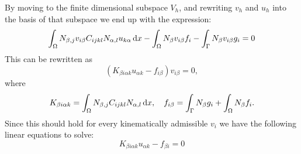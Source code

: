 \documentclass[fem.tex]{subfiles}
\begin{document}
%
By moving to the finite dimensional subspace $V_h$, and rewriting $v_h$ and $u_h$ into the basis of that subspace we end up with the expression:
%
\begin{equation} 
\int_\Omega  N_{\beta,j}v_{i\beta}   C_{ijkl} N_{\alpha,l} u_{k\alpha} \, \mathrm{d} x -\int_\Omega N_\beta v_{i\beta} f_i - \int_\Gamma N_\beta v_{i\beta} g_i = 0
\end{equation}
This can be rewritten as
\begin{equation} 
\left( K_{\beta i \alpha k}u_{\alpha k} - f_{i \beta} \right) v_{i\beta} = 0,
\end{equation}
where
\begin{equation} 
K_{\beta i \alpha k} = \int_\Omega  N_{\beta,j}C_{ijkl}N_{\alpha,l}  \, \mathrm{d} x , \quad f_{i \beta} = \int_\Gamma N_\beta g_i + \int_\Omega N_\beta f_i.
\end{equation}
Since this should hold for every kinematically admissible $v_i$ we have the following linear equations to solve:
\begin{equation} 
K_{\beta i \alpha k}u_{\alpha k} - f_{\beta i} = 0
\end{equation}
\end{document}
